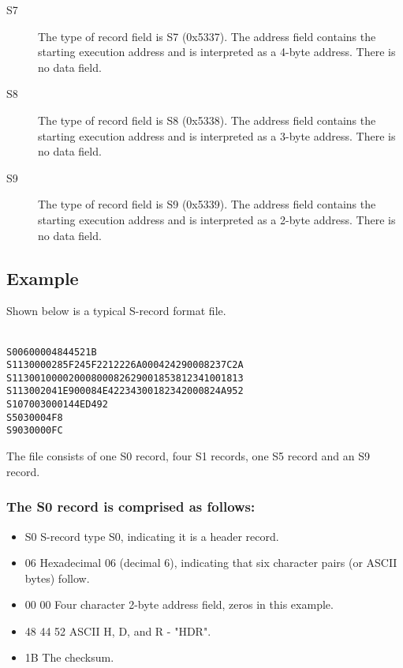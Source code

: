 \begin{description}
            \item[S7]
                The type of record field is S7 (0x5337). The address field contains the starting execution address and is interpreted as a 4-byte address. There is no data field.

            \item[S8]
                The type of record field is S8 (0x5338). The address field contains the starting execution address and is interpreted as a 3-byte address. There is no data field.

            \item[S9]
                The type of record field is S9 (0x5339). The address field contains the starting execution address and is interpreted as a 2-byte address. There is no data field.
        \end{description}

    \subsection{Example}
        Shown below is a typical S-record format file.

        {
            \usecodefont
            \verb''\\
            \verb'S00600004844521B'\\
            \verb'S1130000285F245F2212226A000424290008237C2A'\\
            \verb'S11300100002000800082629001853812341001813'\\
            \verb'S113002041E900084E42234300182342000824A952'\\
            \verb'S107003000144ED492'\\
            \verb'S5030004F8'\\
            \verb'S9030000FC'\\
        }

        The file consists of one S0 record, four S1 records, one S5 record and an S9 record.

    \subsubsection{The S0 record is comprised as follows:}
        \begin{itemize}
            \item S0 S-record type S0, indicating it is a header record.
            \item 06 Hexadecimal 06 (decimal 6), indicating that six character pairs (or ASCII bytes) follow.
            \item 00 00 Four character 2-byte address field, zeros in this example.
            \item 48 44 52 ASCII H, D, and R - "HDR".
            \item 1B The checksum.
        \end{itemize}

